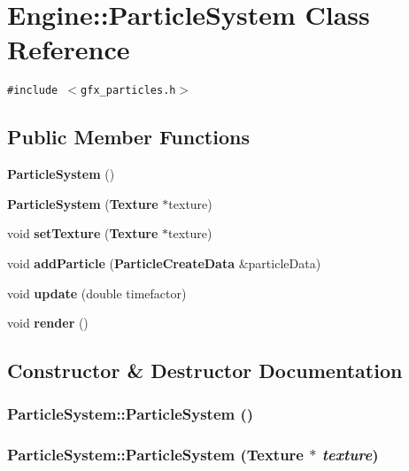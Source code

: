 \section{Engine::ParticleSystem Class Reference}
\label{classEngine_1_1ParticleSystem}
{\tt \#include $<$gfx\_\-particles.h$>$}

\subsection*{Public Member Functions}
\begin{CompactItemize}
\item 
{\bf ParticleSystem} ()
\item 
{\bf ParticleSystem} ({\bf Texture} $\ast$texture)
\item 
void {\bf setTexture} ({\bf Texture} $\ast$texture)
\item 
void {\bf addParticle} ({\bf ParticleCreateData} \&particleData)
\item 
void {\bf update} (double timefactor)
\item 
void {\bf render} ()
\end{CompactItemize}


\subsection{Constructor \& Destructor Documentation}
\subsubsection{\setlength{\rightskip}{0pt plus 5cm}ParticleSystem::ParticleSystem ()}\label{classEngine_1_1ParticleSystem_9028ec8023c61773dd4a668c3ad8cc26}


\subsubsection{\setlength{\rightskip}{0pt plus 5cm}ParticleSystem::ParticleSystem ({\bf Texture} $\ast$ {\em texture})}\label{classEngine_1_1ParticleSystem_df6b2febec98a3fd3812adf8a1645c3a}




